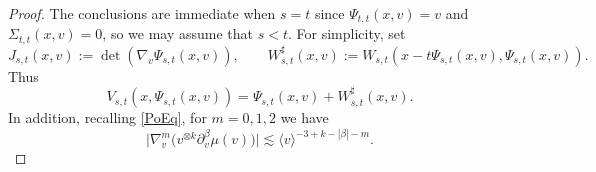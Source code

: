 \documentclass[reqno,11pt]{amsart}
\numberwithin{equation}{section}
\begin{document}
\begin{proof} The conclusions are immediate when $s=t$ since $\Psi_{t,t}(x,v)=v$ and $\Sigma_{t,t}(x,v)=0$, so we may assume that $s<t$.
	For simplicity, set
	\begin{equation}\label{sec5eq11}
	J_{s,t}(x,v):=\det(\nabla_v\Psi_{s,t}(x,v)),\qquad W^\sharp_{s,t}(x,v):=W_{s,t}(x-t\Psi_{s,t}(x,v),\Psi_{s,t}(x,v)).
	\end{equation}
	Thus
	\begin{equation}\label{sigma-Q-identity}
	V_{s,t}(x,\Psi_{s,t}(x,v))=\Psi_{s,t}(x,v)+W^\sharp_{s,t}(x,v).
	\end{equation}
	In addition, recalling \eqref{PoEq}, for $m=0,1,2$ we have
	\begin{equation}\label{sigma-vel-decay}
		\big|\nabla_v^m\bigl(v^{\otimes k}\partial_v^\beta\mu(v)\bigr)\big|\lesssim\langle v\rangle^{-3+k-|\beta|-m}.
	\end{equation}


\end{proof}
\end{document}
